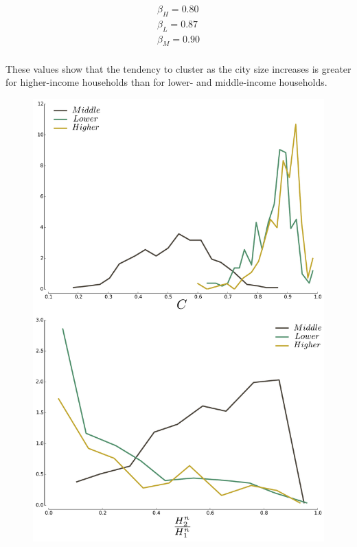 \begin{align*}
    \beta_{H} = 0.80\\
    \beta_{L} = 0.87\\
    \beta_{M} = 0.90\\
\end{align*}

These values show that the tendency to cluster as the city size increases is greater
for higher-income households than for lower- and middle-income households.\\




\begin{figure} 
    \includegraphics[width=\textwidth]{gfx/chapter-segregation/figure6.pdf}\\

\end{figure}
